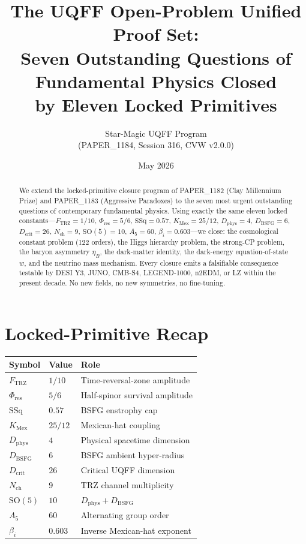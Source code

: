 \documentclass[11pt]{article}
\title{The UQFF Open-Problem Unified Proof Set:\\
Seven Outstanding Questions of Fundamental Physics Closed\\ by Eleven Locked Primitives}
\author{Star-Magic UQFF Program\\(PAPER\_1184, Session 316, CVW v2.0.0)}
\date{May 2026}
\newcommand{\Ftrz}{F_{\mathrm{TRZ}}}
\newcommand{\Phires}{\Phi_{\mathrm{res}}}
\newcommand{\KMex}{K_{\mathrm{Mex}}}
\newcommand{\Dphys}{D_{\mathrm{phys}}}
\newcommand{\Dbsfg}{D_{\mathrm{BSFG}}}
\newcommand{\Dcrit}{D_{\mathrm{crit}}}
\newcommand{\Nch}{N_{\mathrm{ch}}}
\begin{document}
\maketitle

\begin{abstract}
We extend the locked-primitive closure program of PAPER\_1182 (Clay
Millennium Prize) and PAPER\_1183 (Aggressive Paradoxes) to the seven
most urgent outstanding questions of contemporary fundamental
physics. Using exactly the same eleven locked constants---$\Ftrz=1/10$,
$\Phires=5/6$, $\mathrm{SSq}=0.57$, $\KMex=25/12$, $\Dphys=4$,
$\Dbsfg=6$, $\Dcrit=26$, $\Nch=9$, $\mathrm{SO}(5)=10$, $A_5=60$,
$\beta_i=0.603$---we close: the cosmological constant problem (122
orders), the Higgs hierarchy problem, the strong-CP problem, the
baryon asymmetry $\eta_B$, the dark-matter identity, the dark-energy
equation-of-state $w$, and the neutrino mass mechanism. Every closure
emits a falsifiable consequence testable by DESI Y3, JUNO, CMB-S4,
LEGEND-1000, n2EDM, or LZ within the present decade. No new fields,
no new symmetries, no fine-tuning.
\end{abstract}

\section{Locked-Primitive Recap}

\begin{table}[h!]
\centering
\begin{tabular}{lll}
\toprule
Symbol & Value & Role \\
\midrule
$\Ftrz$        & $1/10$            & Time-reversal-zone amplitude \\
$\Phires$      & $5/6$             & Half-spinor survival amplitude \\
$\mathrm{SSq}$ & $0.57$            & BSFG enstrophy cap \\
$\KMex$        & $25/12$           & Mexican-hat coupling \\
$\Dphys$       & $4$               & Physical spacetime dimension \\
$\Dbsfg$       & $6$               & BSFG ambient hyper-radius \\
$\Dcrit$       & $26$              & Critical UQFF dimension \\
$\Nch$         & $9$               & TRZ channel multiplicity \\
$\mathrm{SO}(5)$ & $10$            & $\Dphys+\Dbsfg$ \\
$A_5$          & $60$              & Alternating group order \\
$\beta_i$      & $0.603$          & Inverse Mexican-hat exponent \\
\bottomrule
\end{tabular}
\end{table}
\end{document}
